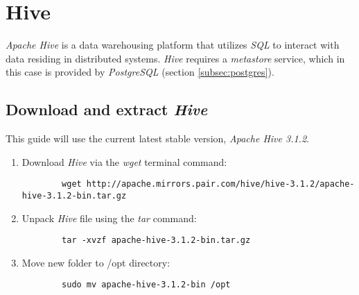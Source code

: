 \documentclass{article}
\begin{document}
\section{Hive}
\emph{Apache Hive} is a data warehousing platform that utilizes \emph{SQL} to interact with
data residing in distributed systems. \emph{Hive} requires a \emph{metastore} service, which in this case
is provided by \emph{PostgreSQL} (section \ref{subsec:postgres}).

    \subsection{Download and extract \emph{Hive}}
    This guide will use the current latest stable version, \emph{Apache Hive 3.1.2}.
    \begin{enumerate}
        \item Download \emph{Hive} via the \emph{wget} terminal command:
        \begin{verbatim}
        wget http://apache.mirrors.pair.com/hive/hive-3.1.2/apache-hive-3.1.2-bin.tar.gz
        \end{verbatim}

        \item Unpack \emph{Hive} file using the \emph{tar} command:
        \begin{verbatim}
        tar -xvzf apache-hive-3.1.2-bin.tar.gz
        \end{verbatim}

        \item Move new folder to /opt directory:
        \begin{verbatim}
        sudo mv apache-hive-3.1.2-bin /opt
        \end{verbatim}
    \end{enumerate}
\end{document}

